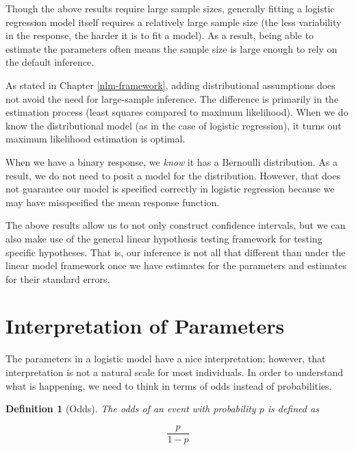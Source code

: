 \documentclass[
]{book}
\theoremstyle{plain}
\theoremstyle{mydefn}
\newtheorem{definition}{Definition}[chapter]
\theoremstyle{myexmpl}
\theoremstyle{remark}
\begin{document}
\begin{rmdtip}
Though the above results require large sample sizes, generally fitting a logistic regression model itself requires a relatively large sample size (the less variability in the response, the harder it is to fit a model). As a result, being able to estimate the parameters often means the sample size is large enough to rely on the default inference.
\end{rmdtip}

As stated in Chapter \ref{nlm-framework}, adding distributional assumptions does not avoid the need for large-sample inference. The difference is primarily in the estimation process (least squares compared to maximum likelihood). When we do know the distributional model (as in the case of logistic regression), it turns out maximum likelihood estimation is optimal.

\begin{rmdwarning}
When we have a binary response, we \emph{know} it has a Bernoulli distribution. As a result, we do not need to posit a model for the distribution. However, that does not guarantee our model is specified correctly in logistic regression because we may have misspecified the mean response function.
\end{rmdwarning}

The above results allow us to not only construct confidence intervals, but we can also make use of the general linear hypothesis testing framework for testing specific hypotheses. That is, our inference is not all that different than under the linear model framework once we have estimates for the parameters and estimates for their standard errors.

\hypertarget{interpretation-of-parameters}{%
\section{Interpretation of Parameters}\label{interpretation-of-parameters}}

The parameters in a logistic model have a nice interpretation; however, that interpretation is not a natural scale for most individuals. In order to understand what is happening, we need to think in terms of odds instead of probabilities.

\begin{definition}[Odds]
\protect\hypertarget{def:defn-odds}{}{\label{def:defn-odds} {} }The odds of an event with probability \(p\) is defined as

\[\frac{p}{1-p}\]
\end{definition}
\end{document}
